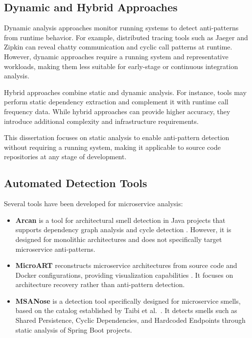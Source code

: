              \subsection{Dynamic and Hybrid Approaches}
             \label{subsec:related-dynamic}

             \indent\par Dynamic analysis approaches monitor running systems to detect anti-patterns from runtime behavior. For example, distributed tracing tools such as Jaeger and Zipkin can reveal chatty communication and cyclic call patterns at runtime. However, dynamic approaches require a running system and representative workloads, making them less suitable for early-stage or continuous integration analysis.

             Hybrid approaches combine static and dynamic analysis. For instance, tools may perform static dependency extraction and complement it with runtime call frequency data. While hybrid approaches can provide higher accuracy, they introduce additional complexity and infrastructure requirements.

             This dissertation focuses on static analysis to enable anti-pattern detection without requiring a running system, making it applicable to source code repositories at any stage of development.

             \subsection{Automated Detection Tools}
             \label{subsec:related-tools}

             \indent\par Several tools have been developed for microservice analysis:

             \begin{itemize}
                 \item \textbf{Arcan} is a tool for architectural smell detection in Java projects that supports dependency graph analysis and cycle detection \cite{Arcelli2017}. However, it is designed for monolithic architectures and does not specifically target microservice anti-patterns.
                 \item \textbf{MicroART} reconstructs microservice architectures from source code and Docker configurations, providing visualization capabilities \cite{Granchelli2017}. It focuses on architecture recovery rather than anti-pattern detection.
                 \item \textbf{MSANose} is a detection tool specifically designed for microservice smells, based on the catalog established by Taibi et al.\ \cite{Walker2020}. It detects smells such as Shared Persistence, Cyclic Dependencies, and Hardcoded Endpoints through static analysis of Spring Boot projects.
             \end{itemize}

